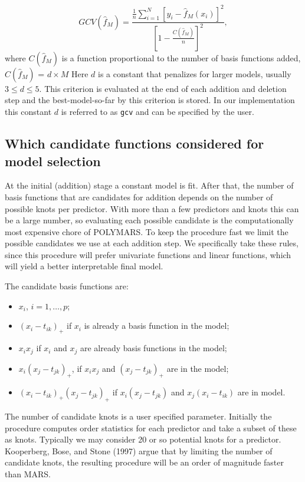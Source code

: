 \begin{equation}\label{gcv}
GCV(\hat{f}_M) = 
\frac{\frac{1}{n}\sum^N_{i=1}[y_i-\hat{f}_M(x_i)]^2}
{\left [1-\frac{C(\hat{f}_M)}{n}\right ]^2},
\end{equation}
where $C(\hat{f}_M)$ is
a function proportional to the number of basis functions added,  
$C(\hat{f}_M)$ = $d \times M$
Here $d$ is a constant that penalizes for larger models, usually
$3\leq d \leq 5$.
This criterion is evaluated at the end of each addition and deletion
step and the
best-model-so-far by this criterion is stored. In our implementation
this constant $d$ is referred to as {\tt gcv} and can be specified by the user.

\subsection*{Which candidate functions considered for model selection}
At the initial (addition) stage a constant model is fit. After
that, the number of basis functions that are candidates for addition
depends on
the number of possible knots per predictor. 
With more than a few predictors and knots
this can be a large number, so evaluating each possible
candidate is the computationally most expensive chore of POLYMARS. To keep
the procedure fast we limit the possible candidates we use
at each addition step. We specifically take these rules, since this
procedure will prefer univariate functions and linear functions,
which will yield a better interpretable final model.

The candidate basis functions are:
\begin{itemize}
\item $x_i$, $i=1,\ldots,p$;
\item $(x_i-t_{ik})_+$ if $x_i$ is already a basis function
in the model;
\item $x_ix_j$ if $x_i$ and $x_j$ are already basis functions in the model;
\item $x_i(x_j-t_{jk})_+$, if $x_ix_j$ and
$(x_j-t_{jk})_+$ are in the model;
\item $(x_i-t_{ik})_+ (x_j-t_{jk})_+$ if
$x_i(x_j-t_{jk})$ and $x_j(x_i-t_{ik})$ are in model.
\end{itemize}

The number of candidate knots is a user specified parameter. Initially
the procedure computes order statistics for each predictor and take
a subset of these as knots. Typically we may consider 20 or so
potential knots for a predictor. Kooperberg, Bose, and Stone (1997)
\cite{I} argue that by limiting the number of
candidate knots, the resulting procedure will be an order of
magnitude faster than MARS. 

